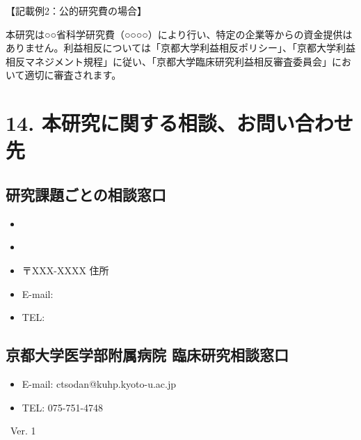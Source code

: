 \documentclass[a4paper,11pt,lualatex,ja=standard]{bxjsarticle}
\begin{document}
\vspace{1em}

\noindent
【記載例2：公的研究費の場合】

\noindent
本研究は○○省科学研究費（○○○○）により行い、特定の企業等からの資金提供はありません。利益相反については「京都大学利益相反ポリシー」、「京都大学利益相反マネジメント規程」に従い、「京都大学臨床研究利益相反審査委員会」において適切に審査されます。

\section*{14. 本研究に関する相談、お問い合わせ先}

\subsection*{研究課題ごとの相談窓口}

\begin{itemize}
\item \InstitutionName\ %
\item %
\item 〒XXX-XXXX 住所
\item E-mail: %
\item TEL: %
\end{itemize}

\subsection*{京都大学医学部附属病院 臨床研究相談窓口}

\begin{itemize}
\item E-mail: ctsodan@kuhp.kyoto-u.ac.jp
\item TEL: 075-751-4748
\end{itemize}

\vspace{3em}

\begin{flushright}
\ProtocolDate\ Ver. 1
\end{flushright}
\end{document}
